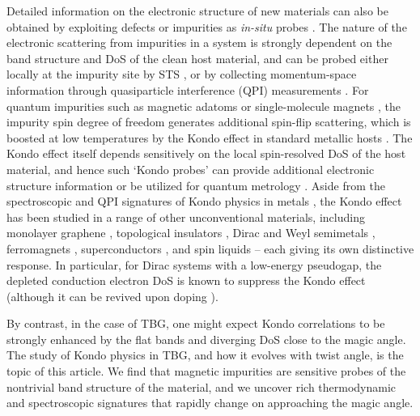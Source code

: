 Detailed information on the electronic structure of new materials can also be obtained by exploiting defects or impurities as \textit{in-situ} probes \cite{crommie1993imaging}. The nature of the electronic scattering from impurities in a system is strongly dependent on the band structure and DoS of the clean host material, and can be probed either locally at the impurity site by STS \cite{jamneala2000scanning,madhavan2001local}, or by collecting momentum-space information through quasiparticle interference (QPI) measurements \cite{hoffman2002imaging}. For quantum impurities such as magnetic adatoms \cite{costi2009kondo,ternes2008spectroscopic} or single-molecule magnets \cite{bogani2008molecular}, the impurity spin degree of freedom generates additional spin-flip scattering, which is boosted at low temperatures by the Kondo effect in standard metallic hosts \cite{Hewson}. The Kondo effect itself depends sensitively on the local spin-resolved DoS of the host material, and hence such `Kondo probes' can provide additional electronic structure information \cite{derry2015quasiparticle,mitchell2015multiple} or be utilized for quantum metrology \cite{mihailescu2022thermometry}. Aside from the spectroscopic and QPI signatures of Kondo physics in metals \cite{ternes2008spectroscopic}, the Kondo effect has been studied in a range of other unconventional materials, including monolayer graphene \cite{chen2011tunable,vojta2010gate,Fritz2013,mitchell2013kondo}, topological insulators \cite{mitchell2013TI}, Dirac and Weyl semimetals \cite{mitchell2015kondo}, ferromagnets \cite{martinek2003kondo,calvo2009kondo}, superconductors \cite{muller1971kondo,polkovnikov2001impurity}, and spin liquids \cite{kolezhuk2006theory,vojta2016kondo,he2022magnetic} -- each giving its own distinctive response. In particular, for Dirac systems with a low-energy pseudogap, the depleted conduction electron DoS is known to suppress the Kondo effect \cite{Fritz2013,mitchell2013TI,mitchell2015kondo} (although it can be revived upon doping \cite{May2018PRB-Kondo-graphene}).

By contrast, in the case of TBG, one might expect Kondo correlations to be strongly enhanced by the flat bands and diverging DoS close to the magic angle. The study of Kondo physics in TBG, and how it evolves with twist angle, is the topic of this article. We find that magnetic impurities are sensitive probes of the nontrivial band structure of the material, and we uncover rich thermodynamic and spectroscopic signatures that rapidly change on approaching the magic angle.

